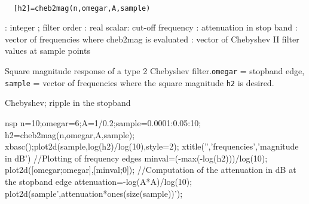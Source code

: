 
\begin{mandesc}
   \\ %
\end{mandesc}
\begin{calling_sequence}
\begin{verbatim}
  [h2]=cheb2mag(n,omegar,A,sample)  
\end{verbatim}
\end{calling_sequence}
\begin{parameters}
  \begin{varlist}
    : integer ; filter order
    : real scalar: cut-off frequency
    : attenuation in stop band
    : vector of frequencies where cheb2mag is evaluated
    : vector of Chebyshev II filter values at sample points
  \end{varlist}
\end{parameters}
\begin{mandescription}
  Square magnitude response of a type 2 Chebyshev filter.\verb!omegar! = stopband edge, \verb!sample! = vector of 
  frequencies where the square magnitude \verb!h2! is desired.
\end{mandescription}
\begin{examples}
  Chebyshev; ripple in the stopband
  \begin{mintednsp}{nsp}
    n=10;omegar=6;A=1/0.2;sample=0.0001:0.05:10;
    h2=cheb2mag(n,omegar,A,sample);
    xbasc();plot2d(sample,log(h2)/log(10),style=2);
    xtitle('','frequencies','magnitude in dB')
    //Plotting of frequency edges
    minval=(-max(-log(h2)))/log(10);
    plot2d([omegar;omegar],[minval;0]);
    //Computation of the attenuation in dB at the stopband edge
    attenuation=-log(A*A)/log(10);
    plot2d(sample',attenuation*ones(size(sample))');
  \end{mintednsp}
\end{examples}
\begin{manseealso}
\end{manseealso}
